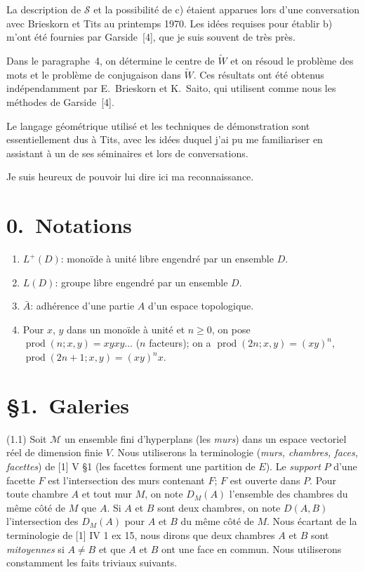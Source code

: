 \documentclass[12pt]{article}
\theoremstyle{remark}
\begin{document}
La description de $\mathscr{S}$ et la possibilité de c) étaient apparues lors d'une conversation avec Brieskorn et Tits au printemps 1970. Les idées requises pour établir b) m'ont été fournies par Garside~[4], que je suis souvent de très près.

Dans le paragraphe~4, on détermine le centre de $\tilde{W}$ et on résoud le problème des mots et le problème de conjugaison dans $\tilde{W}$. Ces résultats ont été obtenus indépendamment par E.~Brieskorn et K.~Saito, qui utilisent comme nous les méthodes de Garside~[4].

Le langage géométrique utilisé et les techniques de démonstration sont essentiellement dus à Tits, avec les idées duquel j'ai pu me familiariser en assistant à un de ses séminaires et lors de conversations.

Je suis heureux de pouvoir lui dire ici ma reconnaissance.

\section*{0.~Notations}

\begin{enumerate}
\item[(0.1)] $L^+(D)$: monoïde à unité libre engendré par un ensemble $D$.
\item[(0.2)] $L(D)$: groupe libre engendré par un ensemble $D$.
\item[(0.3)] $\bar{A}$: adhérence d'une partie $A$ d'un espace topologique.
\item[(0.4)] Pour $x$, $y$ dans un monoïde à unité et $n \geq 0$, on pose $\operatorname{prod}(n; x, y) = xyxy\ldots$ ($n$ facteurs); on a $\operatorname{prod}(2n; x, y) = (xy)^n$, $\operatorname{prod}(2n+1; x, y) = (xy)^n x$.
\end{enumerate}

\section*{\S 1.~Galeries}

(1.1) Soit $\mathcal{M}$ un ensemble fini d'hyperplans (les \emph{murs}) dans un espace vectoriel réel de dimension finie $V$. Nous utiliserons la terminologie (\emph{murs, chambres, faces, facettes}) de [1] V \S 1 (les facettes forment une partition de $E$). Le \emph{support} $P$ d'une facette $F$ est l'intersection des murs contenant $F$; $F$ est ouverte dans $P$. Pour toute chambre $A$ et tout mur $M$, on note $D_M(A)$ l'ensemble des chambres du même côté de $M$ que $A$. Si $A$ et $B$ sont deux chambres, on note $D(A, B)$ l'intersection des $D_M(A)$ pour $A$ et $B$ du même côté de $M$. Nous écartant de la terminologie de [1] IV 1 ex 15, nous dirons que deux chambres $A$ et $B$ sont \emph{mitoyennes} si $A \neq B$ et que $A$ et $B$ ont une face en commun. Nous utiliserons constamment les faits triviaux suivants.
\end{document}
